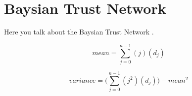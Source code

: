 \section{Baysian Trust Network}
Here you talk about the Baysian Trust Network \cite{btrust}.

\begin{figure}[h]
\begin{equation}
mean = \sum_{j=0}^{n-1}{(j)(d_j)}
\end{equation}
\end{figure}

\begin{figure}[h]
\begin{equation}
variance = \bigg(\sum_{j=0}^{n-1}{(j^2)(d_j)} \bigg) - mean^2
\end{equation}
\end{figure}
